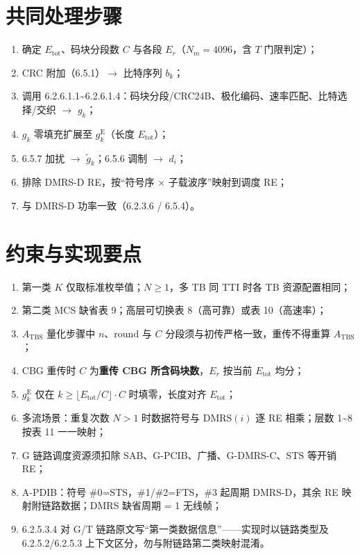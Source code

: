 \documentclass[11pt,a4paper]{ctexart}
\begin{document}
\section{共同处理步骤}

\begin{enumerate}[nosep]
  \item 确定 $E_{\mathrm{tot}}$、码块分段数 $C$ 与各段 $E_r$（$N_m = 4096$，含 $T$ 门限判定）；
  \item CRC 附加（6.5.1）$\rightarrow$ 比特序列 $b_k$；
  \item 调用 6.2.6.1.1\textasciitilde 6.2.6.1.4：码块分段/CRC24B、极化编码、速率匹配、比特选择/交织 $\rightarrow$ $g_k$；
  \item $g_k$ 零填充扩展至 $g^{\mathrm{E}}_k$（长度 $E_{\mathrm{tot}}$）；
  \item 6.5.7 加扰 $\rightarrow$ $\tilde{g}_k$；6.5.6 调制 $\rightarrow$ $d_i$；
  \item 排除 DMRS-D RE，按``符号序 $\times$ 子载波序''映射到调度 RE；
  \item 与 DMRS-D 功率一致（6.2.3.6 / 6.5.4）。
\end{enumerate}

\section{约束与实现要点}

\begin{enumerate}[nosep]
  \item 第一类 $K$ 仅取标准枚举值；$N \geq 1$，多 TB 同 TTI 时各 TB 资源配置相同；
  \item 第二类 MCS 缺省表 9；高层可切换表 8（高可靠）或表 10（高速率）；
  \item $A_{\mathrm{TBS}}$ 量化步骤中 $n$、$\mathrm{round}$ 与 $C$ 分段须与初传严格一致，重传不得重算 $A_{\mathrm{TBS}}$；
  \item CBG 重传时 $C$ 为\textbf{重传 CBG 所含码块数}，$E_r$ 按当前 $E_{\mathrm{tot}}$ 均分；
  \item $g^{\mathrm{E}}_k$ 仅在 $k \geq \lfloor E_{\mathrm{tot}}/C \rfloor \cdot C$ 时填零，长度对齐 $E_{\mathrm{tot}}$；
  \item 多流场景：重复次数 $N>1$ 时数据符号与 $\mathrm{DMRS}(i)$ 逐 RE 相乘；层数 1\textasciitilde 8 按表 11 一一映射；
  \item G 链路调度资源须扣除 SAB、G-PCIB、广播、G-DMRS-C、STS 等开销 RE；
  \item A-PDIB：符号 \#0=STS，\#1/\#2=FTS，\#3 起周期 DMRS-D，其余 RE 映射附链路数据；DMRS 缺省周期 = 1 无线帧；
  \item 6.2.5.3.4 对 G/T 链路原文写``第一类数据信息''——实现时以链路类型及 6.2.5.2/6.2.5.3 上下文区分，勿与附链路第二类映射混淆。
\end{enumerate}
\end{document}
